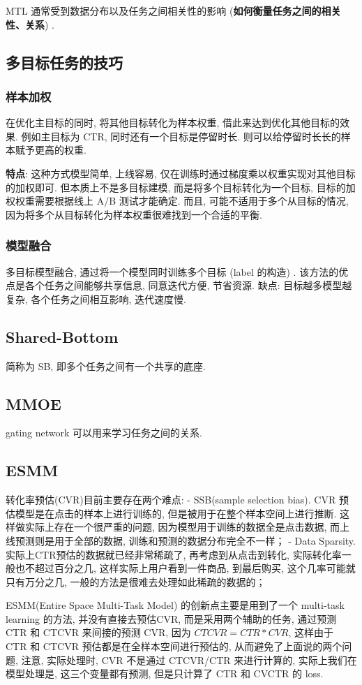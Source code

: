 MTL 通常受到数据分布以及任务之间相关性的影响 (\textbf{如何衡量任务之间的相关性、关系}) . 

\subsection{多目标任务的技巧}
\subsubsection{样本加权}
在优化主目标的同时, 将其他目标转化为样本权重, 借此来达到优化其他目标的效果. 例如主目标为 CTR, 同时还有一个目标是停留时长. 则可以给停留时长长的样本赋予更高的权重. 

\textbf{特点}: 这种方式模型简单, 上线容易, 仅在训练时通过梯度乘以权重实现对其他目标的加权即可. 但本质上不是多目标建模, 而是将多个目标转化为一个目标, 目标的加权权重需要根据线上 A/B 测试才能确定. 而且, 可能不适用于多个从目标的情况, 因为将多个从目标转化为样本权重很难找到一个合适的平衡. 

\subsubsection{模型融合}
多目标模型融合, 通过将一个模型同时训练多个目标 (label 的构造) . 该方法的优点是各个任务之间能够共享信息, 同意迭代方便, 节省资源. 缺点: 目标越多模型越复杂, 各个任务之间相互影响, 迭代速度慢. 

\subsection{Shared-Bottom}
简称为 SB, 即多个任务之间有一个共享的底座. 

\subsection{MMOE}
gating network 可以用来学习任务之间的关系. 

\subsection{ESMM}
转化率预估(CVR)目前主要存在两个难点: 
- SSB(sample selection bias). CVR 预估模型是在点击的样本上进行训练的, 但是被用于在整个样本空间上进行推断. 这样做实际上存在一个很严重的问题, 因为模型用于训练的数据全是点击数据, 而上线预测则是用于全部的数据, 训练和预测的数据分布完全不一样；
- Data Sparsity. 实际上CTR预估的数据就已经非常稀疏了, 再考虑到从点击到转化, 实际转化率一般也不超过百分之几, 这样实际上用户看到一件商品, 到最后购买, 这个几率可能就只有万分之几, 一般的方法是很难去处理如此稀疏的数据的；

ESMM(Entire Space Multi-Task Model) 的创新点主要是用到了一个 multi-task learning 的方法,  并没有直接去预估CVR, 而是采用两个辅助的任务, 通过预测 CTR 和 CTCVR 来间接的预测 CVR, 因为 $CTCVR=CTR * CVR$, 这样由于 CTR 和 CTCVR 预估都是在全样本空间进行预估的, 从而避免了上面说的两个问题,  注意, 实际处理时, CVR 不是通过 CTCVR/CTR 来进行计算的, 实际上我们在模型处理是, 这三个变量都有预测, 但是只计算了 CTR 和 CVCTR 的 loss. 

